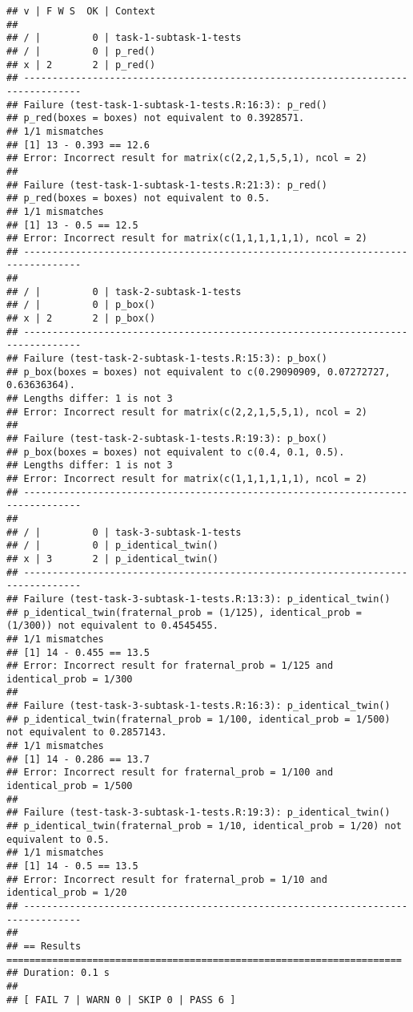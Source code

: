 \documentclass[
]{article}
\begin{document}
\begin{verbatim}
## v | F W S  OK | Context
## 
## / |         0 | task-1-subtask-1-tests                                          
## / |         0 | p_red()                                                         
## x | 2       2 | p_red()
## --------------------------------------------------------------------------------
## Failure (test-task-1-subtask-1-tests.R:16:3): p_red()
## p_red(boxes = boxes) not equivalent to 0.3928571.
## 1/1 mismatches
## [1] 13 - 0.393 == 12.6
## Error: Incorrect result for matrix(c(2,2,1,5,5,1), ncol = 2)
## 
## Failure (test-task-1-subtask-1-tests.R:21:3): p_red()
## p_red(boxes = boxes) not equivalent to 0.5.
## 1/1 mismatches
## [1] 13 - 0.5 == 12.5
## Error: Incorrect result for matrix(c(1,1,1,1,1,1), ncol = 2)
## --------------------------------------------------------------------------------
## 
## / |         0 | task-2-subtask-1-tests                                          
## / |         0 | p_box()                                                         
## x | 2       2 | p_box()
## --------------------------------------------------------------------------------
## Failure (test-task-2-subtask-1-tests.R:15:3): p_box()
## p_box(boxes = boxes) not equivalent to c(0.29090909, 0.07272727, 0.63636364).
## Lengths differ: 1 is not 3
## Error: Incorrect result for matrix(c(2,2,1,5,5,1), ncol = 2)
## 
## Failure (test-task-2-subtask-1-tests.R:19:3): p_box()
## p_box(boxes = boxes) not equivalent to c(0.4, 0.1, 0.5).
## Lengths differ: 1 is not 3
## Error: Incorrect result for matrix(c(1,1,1,1,1,1), ncol = 2)
## --------------------------------------------------------------------------------
## 
## / |         0 | task-3-subtask-1-tests                                          
## / |         0 | p_identical_twin()                                              
## x | 3       2 | p_identical_twin()
## --------------------------------------------------------------------------------
## Failure (test-task-3-subtask-1-tests.R:13:3): p_identical_twin()
## p_identical_twin(fraternal_prob = (1/125), identical_prob = (1/300)) not equivalent to 0.4545455.
## 1/1 mismatches
## [1] 14 - 0.455 == 13.5
## Error: Incorrect result for fraternal_prob = 1/125 and identical_prob = 1/300
## 
## Failure (test-task-3-subtask-1-tests.R:16:3): p_identical_twin()
## p_identical_twin(fraternal_prob = 1/100, identical_prob = 1/500) not equivalent to 0.2857143.
## 1/1 mismatches
## [1] 14 - 0.286 == 13.7
## Error: Incorrect result for fraternal_prob = 1/100 and identical_prob = 1/500
## 
## Failure (test-task-3-subtask-1-tests.R:19:3): p_identical_twin()
## p_identical_twin(fraternal_prob = 1/10, identical_prob = 1/20) not equivalent to 0.5.
## 1/1 mismatches
## [1] 14 - 0.5 == 13.5
## Error: Incorrect result for fraternal_prob = 1/10 and identical_prob = 1/20
## --------------------------------------------------------------------------------
## 
## == Results =====================================================================
## Duration: 0.1 s
## 
## [ FAIL 7 | WARN 0 | SKIP 0 | PASS 6 ]
\end{verbatim}
\end{document}
